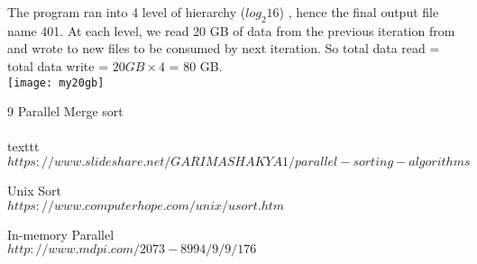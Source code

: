 \documentclass[3pt]{article}
\begin{document}
The program ran into 4 level of hierarchy ($log_2 16$) , hence the final output file name 401. At each level, we read 20 GB of data from the previous iteration from and wrote to new files to be consumed by next iteration. So total data read = total data write =  $20GB \times 4$ = 80 GB. \\

\texttt{[image: my20gb]}

\begin{thebibliography} {9}
Parallel Merge sort
\\\\texttt{$https://www.slideshare.net/GARIMASHAKYA1/parallel-sorting-algorithms$}

Unix Sort
\\\texttt{$https://www.computerhope.com/unix/usort.htm$}


In-memory Parallel
\\\texttt{$http://www.mdpi.com/2073-8994/9/9/176$}


 \end{thebibliography}
\end{document}
